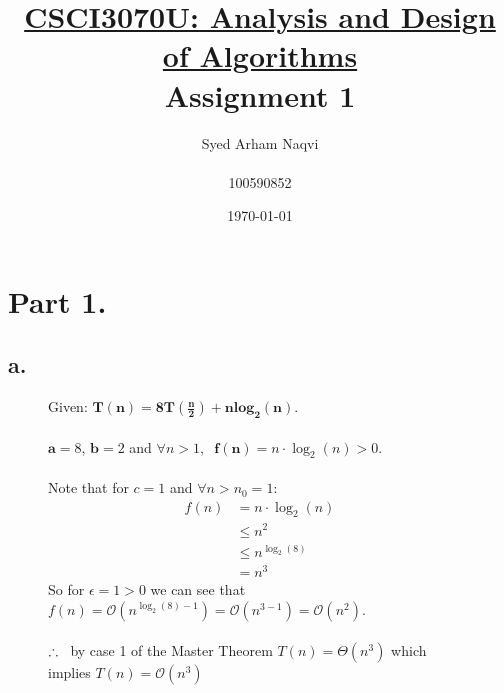 \documentclass{article}
\title{\textbf{\underline{CSCI3070U: Analysis and Design of Algorithms}\\Assignment 1}}
\author{Syed Arham Naqvi\\\\100590852}
\date{\today}
\begin{document}
    \maketitle

    \section*{Part 1.}
        \subsection*{a.}
            
            \begin{figure}[ht]
                
                \centering
                \begin{minipage}{0.9\textwidth}
                    
                    Given: $\mathbf{T(n) = 8T\left(\frac{n}{2}\right) + n log_{2}(n)}$.\\\\
                    $\mathbf{a} = 8$, $\mathbf{b} = 2$ and $\forall n > 1$, $\hspace{5pt} \mathbf{f(n)} = n \cdot \log_{2}(n) > 0$.\\\\
                    Note that for $c=1$ and $\forall n > n_{0} = 1$:
                    \begin{align*}
                                    f(n)    &= n \cdot \log_{2}(n)\\ 
                                            &\leq n^{2}\\
                                            &\leq n^{\log_{2}(8)}\\
                                            &= n^{3}
                    \end{align*}
                    So for $\epsilon = 1 > 0$ we can see that $f(n) = \mathcal{O}(n^{\log_{2}(8) - 1}) = \mathcal{O}(n^{3 - 1}) = \mathcal{O}(n^{2})$.\\\\
                    $\therefore \hspace*{5pt}$ by case 1 of the Master Theorem $T(n) = \Theta(n^{3})$ which implies $T(n) = \mathcal{O}(n^{3})$

                \end{minipage}

            \end{figure}
        
\end{document}
